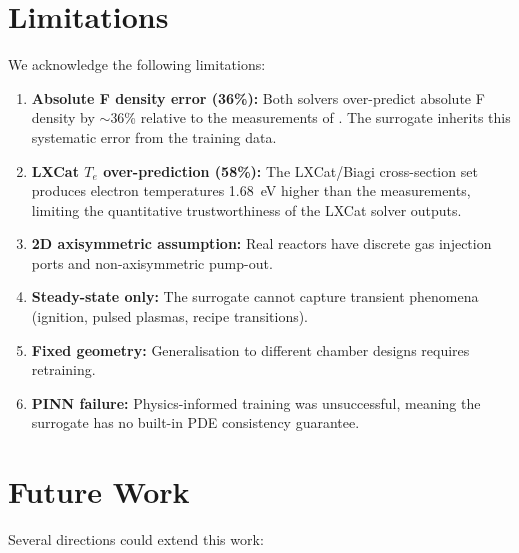 \documentclass[12pt,a4paper]{article}
\begin{document}
\section{Limitations}
\label{sec:limitations}

We acknowledge the following limitations:

\begin{enumerate}
  \item \textbf{Absolute F density error (36\%):}  Both solvers
        over-predict absolute F density by $\sim$36\% relative to the
        measurements of \citet{mettler2020}.  The surrogate inherits
        this systematic error from the training data.

  \item \textbf{LXCat $T_e$ over-prediction (58\%):}  The
        LXCat/Biagi cross-section set produces electron temperatures
        \SI{1.68}{\electronvolt} higher than the
        \citet{lallement2009} measurements, limiting the quantitative
        trustworthiness of the LXCat solver outputs.

  \item \textbf{2D axisymmetric assumption:}  Real reactors have
        discrete gas injection ports and non-axisymmetric pump-out.

  \item \textbf{Steady-state only:}  The surrogate cannot capture
        transient phenomena (ignition, pulsed plasmas, recipe
        transitions).

  \item \textbf{Fixed geometry:}  Generalisation to different chamber
        designs requires retraining.

  \item \textbf{PINN failure:}  Physics-informed training was
        unsuccessful, meaning the surrogate has no built-in PDE
        consistency guarantee.
\end{enumerate}

\section{Future Work}
\label{sec:future}

Several directions could extend this work:
\end{document}
